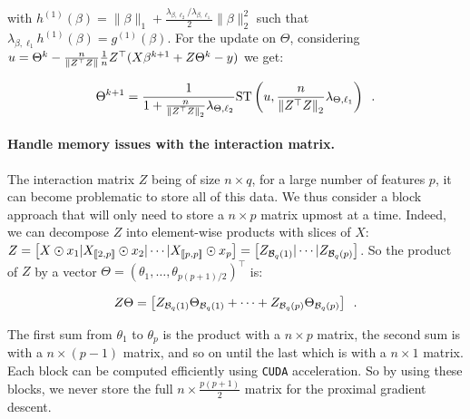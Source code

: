 \documentclass[a4]{article}
\begin{document}
with ${h^{(1)}}(\beta) = \|\beta\|_1 + \frac{\lambda_{\beta, \ell_2} / \lambda_{\beta, \ell_1}}{2} \|\beta\|_2^2$
such that $ \lambda_{\beta, \ell_1}{h^{(1)}}(\beta) = g^{(1)}(\beta)$. For the update on $\Theta$, considering $u = \Theta^k - \frac{n}{\left \lVert  Z^\top Z \right \rVert} \frac{1}{n} Z^\top (X\beta^{k+1} + Z\Theta^k - y)$ we get:

\begin{equation}
	\Theta^{k+1} = \frac{1}{1 + \frac{n}{\left \lVert  Z^\top Z \right \rVert_2} \lambda_{\Theta, \ell_2}}\mathrm{ST}\left(u, \frac{n}{\left \lVert  Z^\top Z \right \rVert_2}\lambda_{\Theta, \ell_1}\right) \enspace.
\end{equation}


\paragraph{Handle memory issues with the interaction matrix.}

The interaction matrix $Z$ being of size $n\times q$,
for a large number of features $p$, it can become problematic to store all of this data. We thus consider a block approach that
will only need to store a $n\times p$ matrix upmost at a time. Indeed, we can decompose $Z$ into element-wise products
with slices of $X$: $Z=\begin{bmatrix}
		X \odot x_1 | X_{\llbracket 2,p \rrbracket} \odot x_2 | \cdots | X_{\llbracket p, p\rrbracket} \odot x_p
	\end{bmatrix}=\begin{bmatrix} Z_{\mathcal{B}_{q}(1)} | \cdots |Z_{\mathcal{B}_{q}(p)} \end{bmatrix}$. So the product of $Z$ by a vector $\Theta=(\theta_1, \dots, \theta_{p(p+1) / 2})^\top$ is:


 \[Z\Theta = \begin{bmatrix}
		Z_{\mathcal{B}_{q}(1)}\Theta_{\mathcal{B}_{q}(1)} + \dots + Z_{\mathcal{B}_{q}(p)}\Theta_{\mathcal{B}_{q}(p)}\\
 \end{bmatrix} \enspace .\]


The first sum from $\theta_1$ to $\theta_p$ is the product with a $n\times p$ matrix,
the second sum is with a $n\times (p-1)$ matrix, and so on until the last which is with a $n\times 1$ matrix.
Each block can be computed efficiently using \texttt{CUDA} acceleration.
So by using these blocks, we never store the full $n\times\frac{p(p+1)}{2}$ matrix for the proximal gradient descent.
\end{document}
